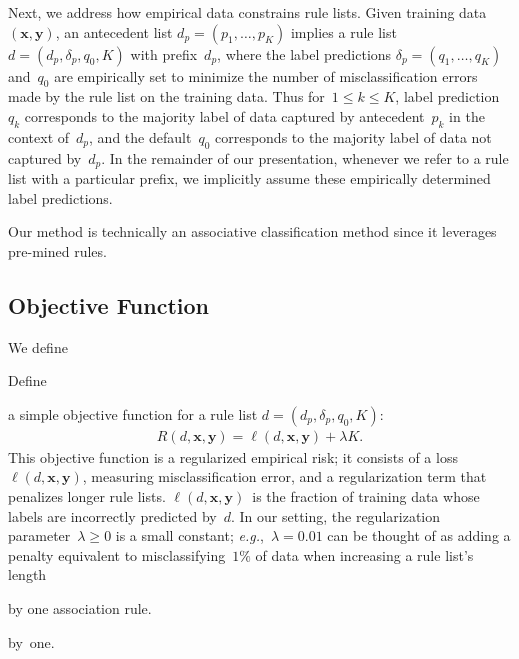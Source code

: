 \documentclass[twoside,11pt]{article}
\def\eg{{\it e.g.},~}
\newcommand{\x}{\mathbf{x}}
\newcommand{\y}{\mathbf{y}}
\def\RL{{d}}
\def\Prefix{d_p}
\def\Labels{\delta_p}
\def\Default{q_0}
\def\Obj{R}
\def\Loss{\ell}
\def\Reg{{\lambda}}
\begin{document}
Next, we address how empirical data constrains rule lists.
%
Given training data~${(\x, \y)}$,
an antecedent list ${\Prefix = (p_1, \dots, p_K)}$
implies a rule list ${\RL = (\Prefix, \Labels, \Default, K)}$
with prefix~$\Prefix$, where the label predictions
${\Labels = (q_1, \dots, q_K)}$ and~$\Default$ are empirically set
to minimize the number of misclassification errors made by
the rule list on the training data.
%
Thus for~${1 \le k \le K}$, label prediction~$q_k$ corresponds to the
majority label of data captured by antecedent~$p_k$ in the context of~$\Prefix$,
and the default~$\Default$ corresponds to the majority label of data
not captured by~$\Prefix$.
%
In the remainder of our presentation, whenever we refer to a rule list with a
particular prefix, we implicitly assume these empirically determined label predictions.

Our method is technically an associative classification method since it
leverages pre-mined rules.

\subsection{Objective Function}
\label{sec:objective}

\begin{arxiv}
We define
\end{arxiv}
\begin{kdd}
Define
\end{kdd}
a simple objective function for a rule list ${\RL = (\Prefix, \Labels, \Default, K)}$:
\begin{align}
\Obj(\RL, \x, \y) = \Loss(\RL, \x, \y) + \Reg K.
\label{eq:objective}
\end{align}
This objective function is a regularized empirical risk;
it consists of a loss~$\Loss(\RL, \x, \y)$, measuring misclassification error,
and a regularization term that penalizes longer rule lists.
%
$\Loss(\RL, \x, \y)$~is the fraction of training data whose labels are
incorrectly predicted by~$\RL$.
%
In our setting, the regularization parameter~${\Reg \ge 0}$ is a small constant;
\eg ${\Reg = 0.01}$ can be thought of as adding a penalty equivalent to misclassifying~$1\%$
of data when increasing a rule list's length
\begin{arxiv}
by one association rule.
\end{arxiv}
\begin{kdd}
by~one.
\end{kdd}
%
\end{document}
